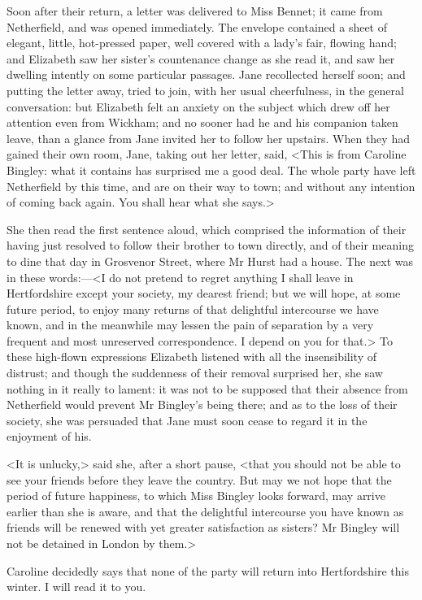 Soon after their return, a letter was delivered to Miss Bennet; it came from Netherfield, and was opened immediately. The envelope contained a sheet of elegant, little, hot-pressed paper, well covered with a lady's fair, flowing hand; and Elizabeth saw her sister's countenance change as she read it, and saw her dwelling intently on some particular passages. Jane recollected herself soon; and putting the letter away, tried to join, with her usual cheerfulness, in the general conversation: but Elizabeth felt an anxiety on the subject which drew off her attention even from Wickham; and no sooner had he and his companion taken leave, than a glance from Jane invited her to follow her upstairs. When they had gained their own room, Jane, taking out her letter, said, <This is from Caroline Bingley: what it contains has surprised me a good deal. The whole party have left Netherfield by this time, and are on their way to town; and without any intention of coming back again. You shall hear what she says.>

She then read the first sentence aloud, which comprised the information of their having just resolved to follow their brother to town directly, and of their meaning to dine that day in Grosvenor Street, where Mr Hurst had a house. The next was in these words:—<I do not pretend to regret anything I shall leave in Hertfordshire except your society, my dearest friend; but we will hope, at some future period, to enjoy many returns of that delightful intercourse we have known, and in the meanwhile may lessen the pain of separation by a very frequent and most unreserved correspondence. I depend on you for that.> To these high-flown expressions Elizabeth listened with all the insensibility of distrust; and though the suddenness of their removal surprised her, she saw nothing in it really to lament: it was not to be supposed that their absence from Netherfield would prevent Mr Bingley's being there; and as to the loss of their society, she was persuaded that Jane must soon cease to regard it in the enjoyment of his.

<It is unlucky,> said she, after a short pause, <that you should not be able to see your friends before they leave the country. But may we not hope that the period of future happiness, to which Miss Bingley looks forward, may arrive earlier than she is aware, and that the delightful intercourse you have known as friends will be renewed with yet greater satisfaction as sisters? Mr Bingley will not be detained in London by them.>

Caroline decidedly says that none of the party will return into Hertfordshire this winter. I will read it to you.


